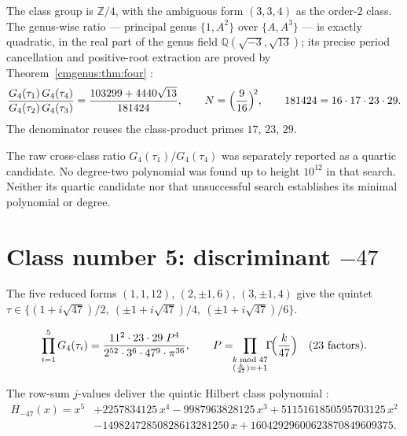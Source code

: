\begin{theorem}\label{cm:res:genus}
The class group is $\mathbb{Z}/4$, with the ambiguous form $(3,3,4)$ as the order-$2$ class.
The genus-wise ratio --- principal genus $\{1,A^2\}$
over $\{A,A^3\}$ --- is exactly quadratic, in the real part of the genus field
$\mathbb{Q}(\sqrt{-3},\sqrt{13})$; its precise period cancellation
and positive-root extraction are proved by Theorem~\ref{cmgenus:thm:four}
:
\[
\frac{G_4(\tau_1)\,G_4(\tau_4)}{G_4(\tau_2)\,G_4(\tau_3)}
=\frac{103299+4440\sqrt{13}}{181424},\qquad
N=\Bigl(\frac{9}{16}\Bigr)^{\!2},\qquad 181424=16\cdot17\cdot23\cdot29 .
\]
The denominator reuses the class-product primes $17$, $23$, $29$.
\end{theorem}

The raw cross-class ratio $G_4(\tau_1)/G_4(\tau_4)$ was separately
reported as a quartic candidate. No degree-two polynomial was found up
to height $10^{12}$ in that search. Neither its quartic candidate nor
that unsuccessful search establishes its minimal polynomial or degree.

\section{Class number 5: discriminant \texorpdfstring{$-47$}{-47}}\label{cm:sec:h5}

The five reduced forms $(1,1,12)$, $(2,\pm1,6)$, $(3,\pm1,4)$ give the quintet
$\tau\in\{(1+i\sqrt{47})/2,\ (\pm1+i\sqrt{47})/4,\ (\pm1+i\sqrt{47})/6\}$.

\begin{theorem}\label{cm:res:d47}
\[
\prod_{i=1}^{5}G_4(\tau_i)
=\frac{11^2\cdot23\cdot29\;P^4}{2^{52}\cdot3^{6}\cdot47^{9}\cdot\pi^{36}},\qquad
P=\!\!\prod_{\substack{k\bmod 47\\ (\frac{k}{47})=+1}}\!\!\Gamma\!\Bigl(\frac{k}{47}\Bigr)
\quad\text{(23 factors)}.
\]
\end{theorem}

\begin{theorem}\label{cm:res:H47}
The row-sum $j$-values deliver the quintic Hilbert class polynomial
:
\begin{align*}
H_{-47}(x)=x^5&+2257834125\,x^4-9987963828125\,x^3+5115161850595703125\,x^2\\
&-14982472850828613281250\,x+16042929600623870849609375 .
\end{align*}
\end{theorem}

